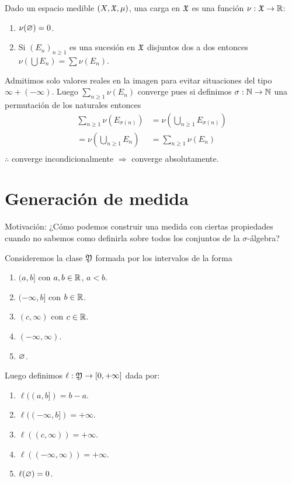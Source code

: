\begin{definition}[Carga]
    Dado un espacio medible \((X, \mathfrak{X}, \mu)\), una carga en \(\mathfrak{X}\) es una función \(\nu : \mathfrak{X} \to \mathbb{R}\): \begin{enumerate}
        \item \(\nu(\varnothing) = 0\).
        \item Si \((E_n)_{n \geq 1}\) es una sucesión en \(\mathfrak{X}\) disjuntos dos a dos entonces \(\nu(\bigcup E_n) = \sum \nu(E_n)\).
    \end{enumerate}

    Admitimos solo valores reales en la imagen para evitar situaciones del tipo \(\infty + (-\infty)\).
    Luego \(\sum_{n \geq 1} \nu(E_n)\) converge pues si definimos \(\sigma : \mathbb{N} \to \mathbb{N}\) una permutación de los naturales entonces
    \begin{align*}
        \sum_{n \geq 1} \nu(E_{\sigma(n)}) & = \nu (\bigcup_{n \geq 1} E_{\sigma(n)}) \\
        = \nu (\bigcup_{n \geq 1} E_n)     & = \sum_{n \geq 1} \nu(E_{n})             \\
    \end{align*}
    \(\therefore\) converge incondicionalmente \(\Rightarrow\) converge absolutamente.
\end{definition}

\section{Generación de medida}

Motivación: ¿Cómo podemos construir una medida con ciertas propiedades
cuando no sabemos como definirla sobre todos los conjuntos de la \(\sigma\)-álgebra?

Consideremos la clase \(\mathfrak{Y}\) formada por los intervalos de la forma \begin{enumerate}
    \item \((a, b]\) con \(a, b \in \mathbb{R}\), \(a<b\).
    \item \((-\infty, b]\) con \(b \in \mathbb{R}\).
    \item \((c, \infty)\) con \(c \in \mathbb{R}\).
    \item \((-\infty, \infty)\).
    \item \(\varnothing\).
\end{enumerate}

Luego definimos \(\ell: \mathfrak{Y} \to [0, +\infty]\) dada por: \begin{enumerate}
    \item \(\ell((a, b]) = b - a\).
    \item \(\ell((-\infty, b]) = +\infty\).
    \item \(\ell((c, \infty)) = +\infty\).
    \item \(\ell((-\infty, \infty)) = +\infty\).
    \item \(\ell(\varnothing) = 0\).
\end{enumerate}

